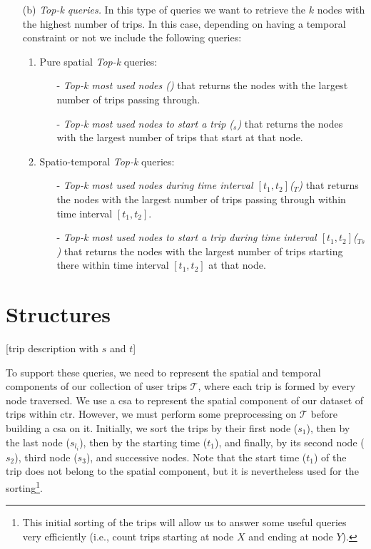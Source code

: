 \begin{itemize}
		\item[(b)] {\em Top-k queries.} In this type of queries we want to retrieve the $k$ nodes with the highest number of trips. In this case, depending on having a temporal constraint or not we include the following queries:
		\begin{enumerate}
			\item Pure spatial {\em Top-k} queries:
			\begin{itemize}
				\item[-] {\em Top-k most used nodes (\topK)} that returns the nodes with the largest number of trips passing through.
				\item[-] {\em Top-k most used nodes to start a trip (\topK$_s$)} that returns the nodes with the largest number of trips that start at that node.
			\end{itemize}
			
			\item Spatio-temporal {\em Top-k}  queries:
			\begin{itemize}
				\item[-] {\em Top-k most used nodes during time interval $[t_1,t_2]$(\topK$_T$)} that returns the nodes with the largest number of trips passing through within time interval $[t_1,t_2]$. 
				\item[-] {\em Top-k most used nodes to start a trip during time interval $[t_1,t_2]$(\topK$_{Ts}$)} that returns the nodes with the largest number of trips starting there within time interval $[t_1,t_2]$ at that node.
			\end{itemize}
		\end{enumerate}
	\end{itemize}

\section{Structures}
	[trip description with $s$ and $t$]

	To support these queries, we need to represent the spatial and temporal components of our collection of user trips $\mathcal{T}$, where each trip is formed by every node traversed. We use a \gls{csa} to represent the spatial component of our dataset of trips within \gls{ctr}. However, we must perform some preprocessing on $\mathcal{T}$ before building a \gls{csa} on it. Initially, we sort the trips by their first node ($s_1$), then by the last node ($s_{l_i}$), then by the starting time ($t_1$), and finally, by its second node ($s_2$), third node ($s_3$), and successive nodes. Note that the start time ($t_1$) of the trip does not belong to the spatial component, but it is nevertheless used for the sorting\footnote{This initial sorting of the trips will allow us to answer some useful queries very efficiently  (i.e., count trips starting at node $X$ and ending at node $Y$).}.

